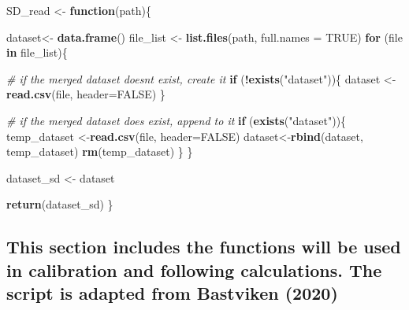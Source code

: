 \documentclass[
]{article}
\newenvironment{Shaded}{\begin{snugshade}}{\end{snugshade}}
\newcommand{\AttributeTok}[1]{\textcolor[rgb]{0.13,0.29,0.53}{#1}}
\newcommand{\CommentTok}[1]{\textcolor[rgb]{0.56,0.35,0.01}{\textit{#1}}}
\newcommand{\ConstantTok}[1]{\textcolor[rgb]{0.56,0.35,0.01}{#1}}
\newcommand{\ControlFlowTok}[1]{\textcolor[rgb]{0.13,0.29,0.53}{\textbf{#1}}}
\newcommand{\FunctionTok}[1]{\textcolor[rgb]{0.13,0.29,0.53}{\textbf{#1}}}
\newcommand{\NormalTok}[1]{#1}
\newcommand{\OtherTok}[1]{\textcolor[rgb]{0.56,0.35,0.01}{#1}}
\newcommand{\SpecialCharTok}[1]{\textcolor[rgb]{0.81,0.36,0.00}{\textbf{#1}}}
\newcommand{\StringTok}[1]{\textcolor[rgb]{0.31,0.60,0.02}{#1}}
\begin{document}
\begin{Shaded}
\begin{Highlighting}[]
\NormalTok{SD\_read }\OtherTok{\textless{}{-}} \ControlFlowTok{function}\NormalTok{(path)\{}
  
\NormalTok{  dataset}\OtherTok{\textless{}{-}} \FunctionTok{data.frame}\NormalTok{()}
\NormalTok{  file\_list }\OtherTok{\textless{}{-}} \FunctionTok{list.files}\NormalTok{(path, }\AttributeTok{full.names =} \ConstantTok{TRUE}\NormalTok{)}
  \ControlFlowTok{for}\NormalTok{ (file }\ControlFlowTok{in}\NormalTok{ file\_list)\{}
    
    \CommentTok{\# if the merged dataset doesn\textquotesingle{}t exist, create it}
    \ControlFlowTok{if}\NormalTok{ (}\SpecialCharTok{!}\FunctionTok{exists}\NormalTok{(}\StringTok{"dataset"}\NormalTok{))\{}
\NormalTok{      dataset }\OtherTok{\textless{}{-}} \FunctionTok{read.csv}\NormalTok{(file, }\AttributeTok{header=}\ConstantTok{FALSE}\NormalTok{)}
\NormalTok{    \}}
    
    \CommentTok{\# if the merged dataset does exist, append to it}
    \ControlFlowTok{if}\NormalTok{ (}\FunctionTok{exists}\NormalTok{(}\StringTok{"dataset"}\NormalTok{))\{}
\NormalTok{      temp\_dataset }\OtherTok{\textless{}{-}}\FunctionTok{read.csv}\NormalTok{(file, }\AttributeTok{header=}\ConstantTok{FALSE}\NormalTok{)}
\NormalTok{      dataset}\OtherTok{\textless{}{-}}\FunctionTok{rbind}\NormalTok{(dataset, temp\_dataset)}
      \FunctionTok{rm}\NormalTok{(temp\_dataset)}
\NormalTok{    \}}
\NormalTok{  \}}
  
\NormalTok{  dataset\_sd }\OtherTok{\textless{}{-}}\NormalTok{ dataset}

  \FunctionTok{return}\NormalTok{(dataset\_sd)}
\NormalTok{\}}
\end{Highlighting}
\end{Shaded}

\hypertarget{this-section-includes-the-functions-will-be-used-in-calibration-and-following-calculations.-the-script-is-adapted-from-bastviken-2020}{%
\subsection{This section includes the functions will be used in
calibration and following calculations. The script is adapted from
Bastviken
(2020)}\label{this-section-includes-the-functions-will-be-used-in-calibration-and-following-calculations.-the-script-is-adapted-from-bastviken-2020}}
\end{document}
